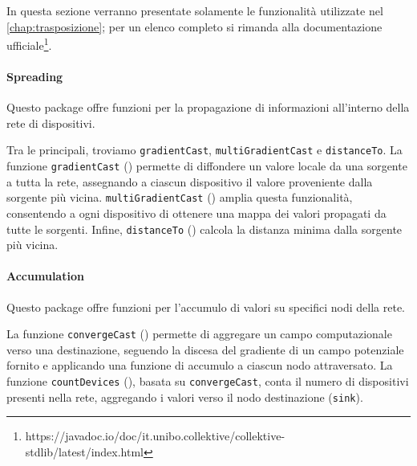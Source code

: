 In questa sezione verranno presentate solamente le funzionalità utilizzate nel \cref{chap:trasposizione}; per un elenco completo si rimanda alla documentazione ufficiale\footnote{https://javadoc.io/doc/it.unibo.collektive/collektive-stdlib/latest/index.html}.

\paragraph{Spreading} Questo package offre funzioni per la propagazione di informazioni all’interno della rete di dispositivi.

Tra le principali, troviamo \texttt{gradientCast}, \texttt{multiGradientCast} e \texttt{distanceTo}.
%
La funzione \texttt{gradientCast} () permette di diffondere un valore locale da una sorgente a tutta la rete, assegnando a ciascun dispositivo il valore proveniente dalla sorgente più vicina.
%
\texttt{multiGradientCast} () amplia questa funzionalità, consentendo a ogni dispositivo di ottenere una mappa dei valori propagati da tutte le sorgenti.
%
Infine, \texttt{distanceTo} () calcola la distanza minima dalla sorgente più vicina.



\newpage




\paragraph{Accumulation} Questo package offre funzioni per l’accumulo di valori su specifici nodi della rete.

La funzione \texttt{convergeCast} () permette di aggregare un campo computazionale verso una destinazione, seguendo la discesa del gradiente di un campo potenziale fornito e applicando una funzione di accumulo a ciascun nodo attraversato.
%
La funzione \texttt{countDevices} (), basata su \texttt{convergeCast}, conta il numero di dispositivi presenti nella rete, aggregando i valori verso il nodo destinazione (\texttt{sink}).

